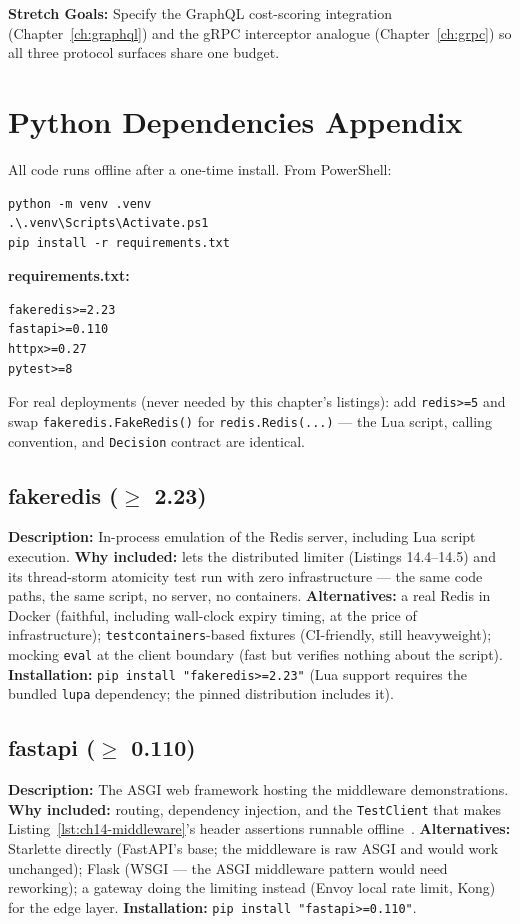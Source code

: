\textbf{Stretch Goals:} Specify the GraphQL cost-scoring integration
(Chapter~\ref{ch:graphql}) and the gRPC interceptor analogue
(Chapter~\ref{ch:grpc}) so all three protocol surfaces share one budget.

\section{Python Dependencies Appendix}
\label{sec:ch14-deps}

All code runs offline after a one-time install. From PowerShell:

\begin{verbatim}
python -m venv .venv
.\.venv\Scripts\Activate.ps1
pip install -r requirements.txt
\end{verbatim}

\noindent\textbf{requirements.txt:}
\begin{verbatim}
fakeredis>=2.23
fastapi>=0.110
httpx>=0.27
pytest>=8
\end{verbatim}

For real deployments (never needed by this chapter's listings): add
\texttt{redis>=5} and swap \texttt{fakeredis.FakeRedis()} for
\texttt{redis.Redis(...)} --- the Lua script, calling convention, and
\texttt{Decision} contract are identical.

\subsection{fakeredis ($\geq$ 2.23)}
\textbf{Description:} In-process emulation of the Redis server, including
Lua script execution. \textbf{Why included:} lets the distributed limiter
(Listings 14.4--14.5) and its thread-storm atomicity test run with zero
infrastructure --- the same code paths, the same script, no server, no
containers. \textbf{Alternatives:} a real Redis in Docker (faithful,
including wall-clock expiry timing, at the price of infrastructure);
\texttt{testcontainers}-based fixtures (CI-friendly, still heavyweight);
mocking \texttt{eval} at the client boundary (fast but verifies nothing
about the script). \textbf{Installation:}
\texttt{pip install "fakeredis>=2.23"} (Lua support requires the bundled
\texttt{lupa} dependency; the pinned distribution includes it).

\subsection{fastapi ($\geq$ 0.110)}
\textbf{Description:} The ASGI web framework hosting the middleware
demonstrations. \textbf{Why included:} routing, dependency injection, and
the \texttt{TestClient} that makes Listing~\ref{lst:ch14-middleware}'s
header assertions runnable offline~\cite{fastapidocs}.
\textbf{Alternatives:} Starlette directly (FastAPI's base; the middleware
is raw ASGI and would work unchanged); Flask (WSGI --- the ASGI middleware
pattern would need reworking); a gateway doing the limiting instead (Envoy
local rate limit, Kong) for the edge layer. \textbf{Installation:}
\texttt{pip install "fastapi>=0.110"}.

